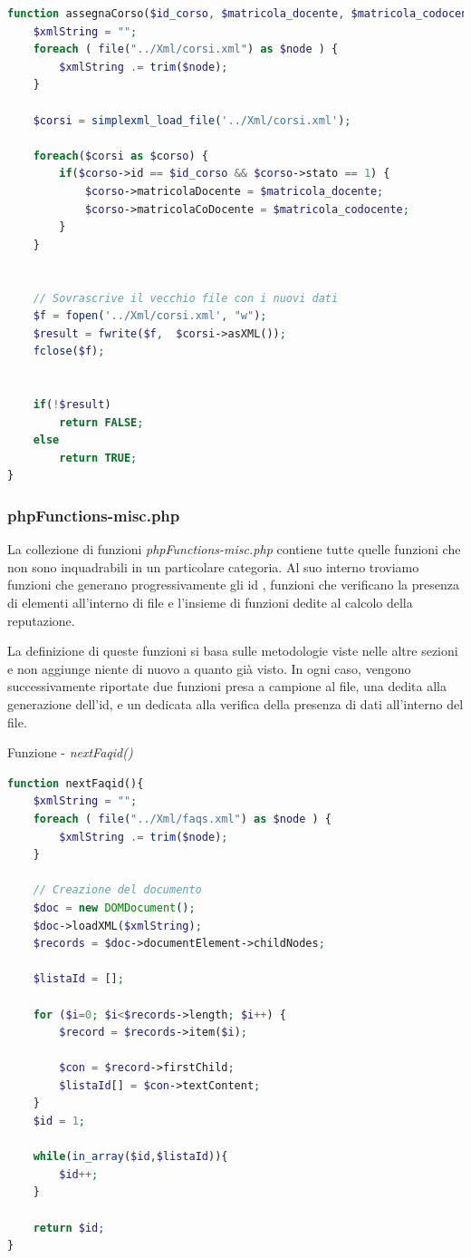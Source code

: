 \documentclass [a4paper,11pt]{book}
\begin{document}
\begin{lstlisting}[language=PHP]
function assegnaCorso($id_corso, $matricola_docente, $matricola_codocente) {
    $xmlString = "";
    foreach ( file("../Xml/corsi.xml") as $node ) {
        $xmlString .= trim($node);
    }

    $corsi = simplexml_load_file('../Xml/corsi.xml');

    foreach($corsi as $corso) {
        if($corso->id == $id_corso && $corso->stato == 1) {
            $corso->matricolaDocente = $matricola_docente;
            $corso->matricolaCoDocente = $matricola_codocente;
        }
    }


    // Sovrascrive il vecchio file con i nuovi dati
    $f = fopen('../Xml/corsi.xml', "w");
    $result = fwrite($f,  $corsi->asXML());
    fclose($f);


    if(!$result) 
        return FALSE;
    else
        return TRUE;
}
\end{lstlisting}

\medskip

\subsubsection{phpFunctions-misc.php}

La collezione di funzioni \emph{phpFunctions-misc.php} contiene tutte quelle funzioni che non sono inquadrabili in un particolare categoria. Al suo interno troviamo funzioni che generano progressivamente gli id , funzioni che verificano la presenza di elementi all'interno di file e l'insieme di funzioni dedite al calcolo della reputazione.

La definizione di queste funzioni si basa sulle metodologie viste nelle altre sezioni e non aggiunge niente di nuovo a quanto già visto. In ogni caso, vengono successivamente riportate due funzioni presa a campione al file, una dedita alla generazione dell'id, e un dedicata alla verifica della presenza di dati all'interno del file.
 
\medskip

Funzione - \emph{nextFaqid()} 

\medskip

\begin{lstlisting}[language=PHP]
function nextFaqid(){
    $xmlString = "";
    foreach ( file("../Xml/faqs.xml") as $node ) {
        $xmlString .= trim($node);
    }
         
    // Creazione del documento
    $doc = new DOMDocument();
    $doc->loadXML($xmlString);
    $records = $doc->documentElement->childNodes;
     
    $listaId = [];
     
    for ($i=0; $i<$records->length; $i++) {
        $record = $records->item($i);
             
        $con = $record->firstChild;
        $listaId[] = $con->textContent;
    }
    $id = 1;

    while(in_array($id,$listaId)){
        $id++;
    }
    
    return $id;
}
\end{lstlisting}
\end{document}
